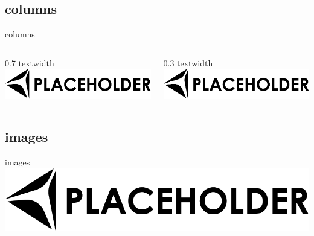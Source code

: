 \documentclass{beamer}
\begin{document}
\subsection{columns}
\begin{frame}{columns}
  \begin{columns}
    \begin{column}{.7\textwidth}
      0.7 textwidth
      \includegraphics[width=\textwidth]{resources/placeholder1}
    \end{column}

    \begin{column}{.3\textwidth}
      0.3 textwidth
      \includegraphics[width=\textwidth]{resources/placeholder1}
    \end{column}
  \end{columns}
\end{frame}

\subsection{images}
\begin{frame}[t]{images}
  \centering
  \includegraphics[width=\textwidth]{resources/placeholder1}
\end{frame}
\end{document}
